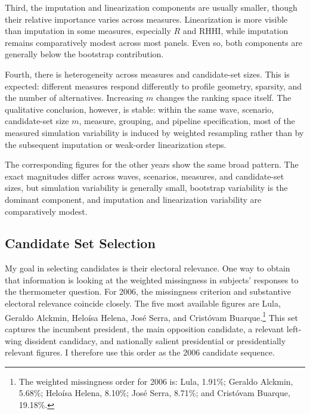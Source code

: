 \documentclass[12pt]{article}
\begin{document}
Third, the imputation and linearization components are usually smaller, though
their relative importance varies across measures. Linearization is more visible
than imputation in some measures, especially \(R\) and \(\mathrm{RHHI}\), while
imputation remains comparatively modest across most panels. Even so, both
components are generally below the bootstrap contribution.

Fourth, there is heterogeneity across measures and candidate-set sizes. This is
expected: different measures respond differently to profile geometry, sparsity,
and the number of alternatives. Increasing \(m\) changes the ranking space
itself. The qualitative conclusion, however, is stable: within the same wave,
scenario, candidate-set size \(m\), measure, grouping, and pipeline
specification, most of the measured simulation variability is induced by
weighted resampling rather than by the subsequent imputation or weak-order
linearization steps.

The corresponding figures for the other years show the same broad pattern. The
exact magnitudes differ across waves, scenarios, measures, and candidate-set
sizes, but simulation variability is generally small, bootstrap variability is
the dominant component, and imputation and linearization variability are
comparatively modest.

\subsection{Candidate Set Selection}
\label{app:candidate-set-selection}

My goal in selecting candidates is their electoral relevance. One way to obtain
that information is looking at the weighted missingness in subjects' responses
to the thermometer question. For 2006, the missingness criterion and substantive
electoral relevance coincide closely. The five most available figures are Lula,
Geraldo Alckmin, Heloísa Helena, José Serra, and Cristóvam Buarque.\footnote{The weighted missingness order for 2006 is: Lula, 1.91\%; Geraldo Alckmin, 5.68\%; Heloísa Helena, 8.10\%; José Serra, 8.71\%; and Cristóvam Buarque, 19.18\%.} This set
captures the incumbent president, the main opposition candidate, a relevant
left-wing dissident candidacy, and nationally salient presidential or
presidentially relevant figures. I therefore use this order as the 2006
candidate sequence.
\end{document}
